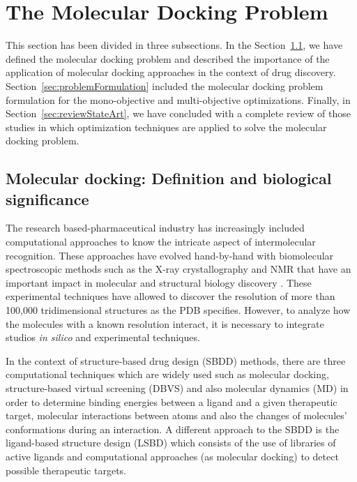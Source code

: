 \chapter{The Molecular Docking Problem}
\label{chapter:molecularDocking}

This section has been divided in three subsections. In the Section~\ref{sec:molecularDockingDefinition}, we have defined the molecular docking problem and described the importance of the application of molecular docking approaches in the context of drug discovery. Section~\ref{sec:problemFormulation} included the molecular docking problem formulation for the mono-objective and multi-objective optimizations. Finally, in Section~\ref{sec:reviewStateArt}, we have concluded with a complete review of those studies in which optimization techniques are applied to solve the molecular docking problem.

\section{Molecular docking: Definition and biological significance}
\label{sec:molecularDockingDefinition}

The research based-pharmaceutical industry has increasingly included computational approaches to know the intricate aspect of intermolecular recognition. These approaches have evolved hand-by-hand with biomolecular spectroscopic methods such as the X-ray crystallography and NMR that have an important impact in molecular and structural biology discovery \cite{Ferreira2015}. These experimental techniques have allowed to discover the resolution of more than 100,000 tridimensional structures as the PDB specifies. However, to analyze how the molecules with a known resolution interact, it is necessary to integrate studios \emph{in silico} and experimental techniques.

In the context of structure-based drug design (SBDD) methods, there are three computational techniques which are widely used such as molecular docking, structure-based virtual screening (DBVS) and also molecular dynamics (MD) in order to determine binding energies between a ligand and a given therapeutic target, molecular interactions between atoms and also the changes of molecules' conformations during an interaction. A different approach to the SBDD is the ligand-based structure design (LSBD) which consists of the use of libraries of active ligands and computational approaches (as molecular docking) to detect possible therapeutic targets.

